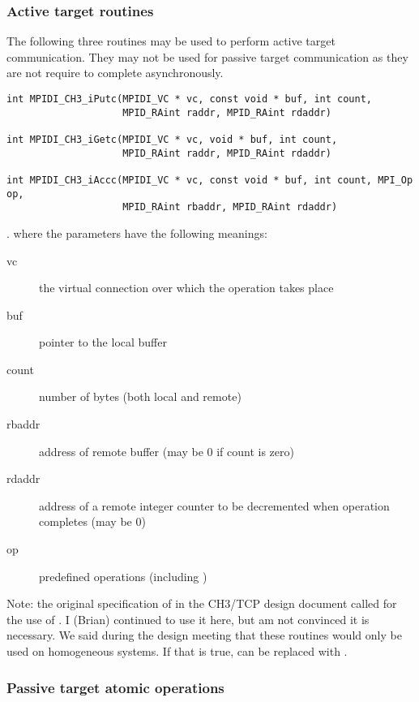 \documentclass{article}
\begin{document}
\subsubsection{Active target routines}

The following three routines may be used to perform active target
communication.  They may not be used for passive target communication as
they are not require to complete asynchronously.

\begin{verbatim}
int MPIDI_CH3_iPutc(MPIDI_VC * vc, const void * buf, int count,
                    MPID_RAint raddr, MPID_RAint rdaddr)

int MPIDI_CH3_iGetc(MPIDI_VC * vc, void * buf, int count,
                    MPID_RAint raddr, MPID_RAint rdaddr)

int MPIDI_CH3_iAccc(MPIDI_VC * vc, const void * buf, int count, MPI_Op op,
                    MPID_RAint rbaddr, MPID_RAint rdaddr)
\end{verbatim}.
where the parameters have the following meanings:
\begin{description}
\item[vc]the virtual connection over which the operation takes place

\item[buf]pointer to the local buffer

\item[count]number of bytes (both local and remote)

\item[rbaddr]address of remote buffer (may be 0 if count is zero)

\item[rdaddr]address of a remote integer counter to be decremented when
operation completes (may be 0)

\item[op] predefined  operations (including
  ) 
\end{description}

Note: the original specification of  in the CH3/TCP design
document called for the use of .  I (Brian) continued
to use it here, but 
am not convinced it is necessary.  We said during the design meeting that
these routines would only be used on homogeneous systems.  If that is true,
 can be replaced with .


\subsubsection{Passive target atomic operations}
\end{document}
